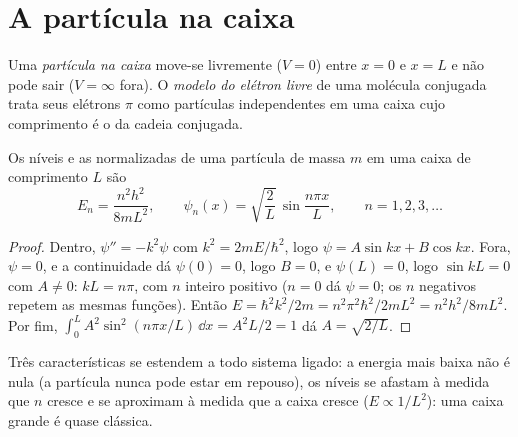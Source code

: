 \section{A partícula na caixa}

\begin{definition}\label{def:b3:quantum-model-systems:box}
Uma \emph{partícula na caixa} move-se livremente ($V = 0$)
entre $x = 0$ e $x = L$ e não pode sair ($V = \infty$ fora). O
\emph{modelo do elétron livre} de uma molécula
conjugada trata seus elétrons $\pi$ como partículas independentes em uma
caixa cujo comprimento é o da cadeia conjugada.
\end{definition}

\begin{theorem}\label{thm:b3:quantum-model-systems:box}
Os níveis e as  normalizadas de uma partícula de massa $m$ em uma
caixa de comprimento $L$ são
\[
E_n = \frac{n^2h^2}{8mL^2}, \qquad \psi_n(x) = \sqrt{\frac2L}\,\sin\frac{n\pi
x}{L}, \qquad n = 1, 2, 3, \dots
\]
\end{theorem}

\begin{proof}
Dentro, $\psi'' = -k^2\psi$ com $k^2 = 2mE/\hbar^2$, logo $\psi = A\sin kx +
B\cos kx$. Fora, $\psi = 0$, e a continuidade dá $\psi(0) = 0$, logo $B =
0$, e $\psi(L) = 0$, logo $\sin kL = 0$ com $A \ne 0$: $kL = n\pi$, com $n$
inteiro positivo ($n = 0$ dá $\psi = 0$; os $n$ negativos repetem as mesmas
funções). Então $E = \hbar^2k^2/2m = n^2\pi^2\hbar^2/2mL^2 = n^2h^2/8mL^2$.
Por fim, $\int_0^L A^2\sin^2(n\pi x/L)\,\dd x = A^2L/2 = 1$ dá $A =
\sqrt{2/L}$.
\end{proof}

Três características se estendem a todo sistema ligado: a energia mais
baixa não é nula (a partícula nunca pode estar em repouso), os níveis se
afastam à medida que $n$ cresce e se aproximam à medida que a caixa cresce
($E \propto 1/L^2$): uma caixa grande é quase clássica.

